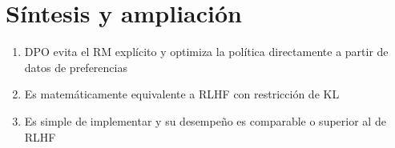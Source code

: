 \documentclass[a4paper]{article}
\begin{document}
\newpage
\section{Síntesis y ampliación}
\begin{enumerate}
  \item DPO evita el RM explícito y optimiza la política directamente a partir de datos de preferencias
  \item Es matemáticamente equivalente a RLHF con restricción de KL
  \item Es simple de implementar y su desempeño es comparable o superior al de RLHF
\end{enumerate}
\end{document}
